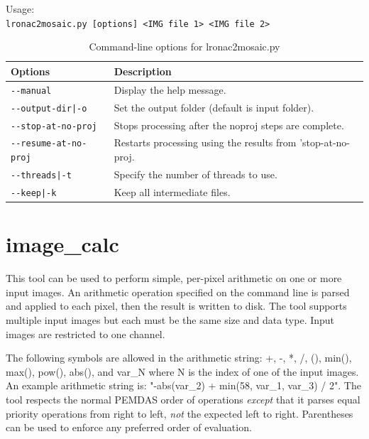 \medskip

Usage:\\
\hspace*{2em}\texttt{lronac2mosaic.py [options] <IMG file 1> <IMG file 2>}

\medskip

\begin{longtable}{|l|p{10cm}|}
\caption{Command-line options for lronac2mosaic.py}
\label{tbl:lronac2mosaic}
\endfirsthead
\endhead
\endfoot
\endlastfoot
\hline
Options & Description \\ \hline \hline
\texttt{-\/-manual} & Display the help message.\\ \hline
\texttt{-\/-output-dir|-o} & Set the output folder (default is input folder).\\ \hline
\texttt{-\/-stop-at-no-proj} & Stops processing after the noproj steps are complete. \\ \hline
\texttt{-\/-resume-at-no-proj} & Restarts processing using the results from 'stop-at-no-proj. \\ \hline
\texttt{-\/-threads|-t} & Specify the number of threads to use.\\ \hline
\texttt{-\/-keep|-k} & Keep all intermediate files.\\ \hline
\end{longtable}


\section{image\_calc}
\label{imagecalc}

This tool can be used to perform simple, per-pixel arithmetic on one or more
input images. An arithmetic operation specified on the command line is parsed
and applied to each pixel, then the result is written to disk. The tool
supports multiple input images but each must be the same size and data type.
Input images are restricted to one channel.

The following symbols are allowed in the arithmetic string: +, -, *, /,
(), min(), max(), pow(), abs(), and var\_N where N is the index of one
of the input images. An example arithmetic string is: "-abs(var\_2) +
min(58, var\_1, var\_3) / 2".  The tool respects the normal PEMDAS order
of operations \textit{except} that it parses equal priority operations
from right to left, \textit{not} the expected left to right.
Parentheses can be used to enforce any preferred order of evaluation.


\medskip

